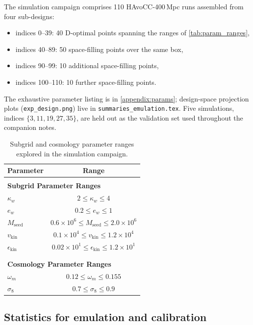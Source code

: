 \documentclass{article}
\begin{document}
The simulation campaign comprises 110 HAvoCC-400\,Mpc runs assembled from four sub-designs:
\begin{itemize}
    \item indices 0--39: 40 D-optimal points spanning the ranges of \autoref{tab:param_ranges},
    \item indices 40--89: 50 space-filling points over the same box,
    \item indices 90--99: 10 additional space-filling points,
    \item indices 100--110: 10 further space-filling points.
\end{itemize}

The exhaustive parameter listing is in \autoref{appendix:params}; design-space projection plots (\texttt{exp\_design.png}) live in \texttt{summaries\_emulation.tex}. Five simulations, indices $\{3,11,19,27,35\}$, are held out as the validation set used throughout the companion notes.

\begin{table}[htbp]
\centering
\caption{Subgrid and cosmology parameter ranges explored in the simulation campaign.}
\label{tab:param_ranges}
\begin{tabular}{lc}
\hline\hline
Parameter & Range \\
\hline \\
\multicolumn{2}{l}{\textbf{Subgrid Parameter Ranges}} \\
$\kappa_w$ & $2 \le \kappa_w \le 4$ \\
$e_w$ & $0.2 \le e_w \le 1$ \\
$M_\mathrm{seed}$ & $0.6 \times 10^{6} \le M_\mathrm{seed} \le 2.0 \times 10^{6}$ \\
$v_\mathrm{kin}$ & $0.1 \times 10^{4} \le v_\mathrm{kin} \le 1.2 \times 10^{4}$ \\
$\epsilon_\mathrm{kin}$ & $0.02 \times 10^{1} \le \epsilon_\mathrm{kin} \le 1.2 \times 10^{1}$ \\ \\
\hline \\
\multicolumn{2}{l}{\textbf{Cosmology Parameter Ranges}} \\
$\omega_m$ & $0.12 \le \omega_m \le 0.155$ \\
$\sigma_8$ & $0.7 \le \sigma_8 \le 0.9$ \\
\hline\hline
\end{tabular}
\end{table}


\subsection{Statistics for emulation and calibration}
\label{sec:obs}
\end{document}
